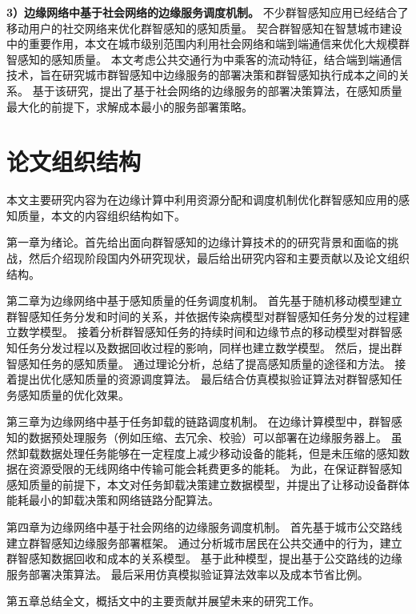 \textbf{3）边缘网络中基于社会网络的边缘服务调度机制。}
不少群智感知应用已经结合了移动用户的社交网络来优化群智感知的感知质量。
契合群智感知在智慧城市建设中的重要作用，本文在城市级别范围内利用社会网络和端到端通信来优化大规模群智感知的感知质量。
本文考虑公共交通行为中乘客的流动特征，结合端到端通信技术，旨在研究城市群智感知中边缘服务的部署决策和群智感知执行成本之间的关系。
基于该研究，提出了基于社会网络的边缘服务的部署决策算法，在感知质量最大化的前提下，求解成本最小的服务部署策略。

\section{论文组织结构}


本文主要研究内容为在边缘计算中利用资源分配和调度机制优化群智感知应用的感知质量，本文的内容组织结构如下。

第一章为绪论。首先给出面向群智感知的边缘计算技术的的研究背景和面临的挑战，然后介绍现阶段国内外研究现状，最后给出研究内容和主要贡献以及论文组织结构。


第二章为边缘网络中基于感知质量的任务调度机制。
首先基于随机移动模型建立群智感知任务分发和时间的关系，并依据传染病模型对群智感知任务分发的过程建立数学模型。
接着分析群智感知任务的持续时间和边缘节点的移动模型对群智感知任务分发过程以及数据回收过程的影响，同样也建立数学模型。
然后，提出群智感知任务的感知质量。
通过理论分析，总结了提高感知质量的途径和方法。
接着提出优化感知质量的资源调度算法。
最后结合仿真模拟验证算法对群智感知任务感知质量的优化效果。

第三章为边缘网络中基于任务卸载的链路调度机制。
在边缘计算模型中，群智感知的数据预处理服务（例如压缩、去冗余、校验）可以部署在边缘服务器上。
虽然卸载数据处理任务能够在一定程度上减少移动设备的能耗，但是未压缩的感知数据在资源受限的无线网络中传输可能会耗费更多的能耗。
为此，在保证群智感知感知质量的前提下，本文对任务卸载决策建立数据模型，并提出了让移动设备群体能耗最小的卸载决策和网络链路分配算法。

第四章为边缘网络中基于社会网络的边缘服务调度机制。
首先基于城市公交路线建立群智感知边缘服务部署框架。
通过分析城市居民在公共交通中的行为，建立群智感知数据回收和成本的关系模型。
基于此种模型，提出基于公交路线的边缘服务部署决策算法。
最后采用仿真模拟验证算法效率以及成本节省比例。

第五章总结全文，概括文中的主要贡献并展望未来的研究工作。
